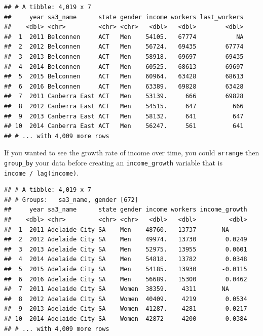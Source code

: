 \documentclass[]{book}
\newenvironment{Shaded}{\begin{snugshade}}{\end{snugshade}}
\newcommand{\DataTypeTok}[1]{\textcolor[rgb]{0.13,0.29,0.53}{#1}}
\newcommand{\DecValTok}[1]{\textcolor[rgb]{0.00,0.00,0.81}{#1}}
\newcommand{\KeywordTok}[1]{\textcolor[rgb]{0.13,0.29,0.53}{\textbf{#1}}}
\newcommand{\NormalTok}[1]{#1}
\newcommand{\OperatorTok}[1]{\textcolor[rgb]{0.81,0.36,0.00}{\textbf{#1}}}
\newcommand{\StringTok}[1]{\textcolor[rgb]{0.31,0.60,0.02}{#1}}
\begin{document}
\begin{verbatim}
## # A tibble: 4,019 x 7
##     year sa3_name      state gender income workers last_workers
##    <dbl> <chr>         <chr> <chr>   <dbl>   <dbl>        <dbl>
##  1  2011 Belconnen     ACT   Men    54105.   67774           NA
##  2  2012 Belconnen     ACT   Men    56724.   69435        67774
##  3  2013 Belconnen     ACT   Men    58918.   69697        69435
##  4  2014 Belconnen     ACT   Men    60525.   68613        69697
##  5  2015 Belconnen     ACT   Men    60964.   63428        68613
##  6  2016 Belconnen     ACT   Men    63389.   69828        63428
##  7  2011 Canberra East ACT   Men    53139.     666        69828
##  8  2012 Canberra East ACT   Men    54515.     647          666
##  9  2013 Canberra East ACT   Men    58132.     641          647
## 10  2014 Canberra East ACT   Men    56247.     561          641
## # ... with 4,009 more rows
\end{verbatim}

If you wanted to see the growth rate of income over time, you could \texttt{arrange} then \texttt{group\_by} your data before creating an \texttt{income\_growth} variable that is \texttt{income\ /\ lag(income)}.

\begin{Shaded}
\end{Shaded}

\begin{verbatim}
## # A tibble: 4,019 x 7
## # Groups:   sa3_name, gender [672]
##     year sa3_name      state gender income workers income_growth
##    <dbl> <chr>         <chr> <chr>   <dbl>   <dbl>         <dbl>
##  1  2011 Adelaide City SA    Men    48760.   13737       NA     
##  2  2012 Adelaide City SA    Men    49974.   13730        0.0249
##  3  2013 Adelaide City SA    Men    52975.   13955        0.0601
##  4  2014 Adelaide City SA    Men    54818.   13782        0.0348
##  5  2015 Adelaide City SA    Men    54185.   13930       -0.0115
##  6  2016 Adelaide City SA    Men    56689.   15300        0.0462
##  7  2011 Adelaide City SA    Women  38359.    4311       NA     
##  8  2012 Adelaide City SA    Women  40409.    4219        0.0534
##  9  2013 Adelaide City SA    Women  41287.    4281        0.0217
## 10  2014 Adelaide City SA    Women  42872     4200        0.0384
## # ... with 4,009 more rows
\end{verbatim}
\end{document}
